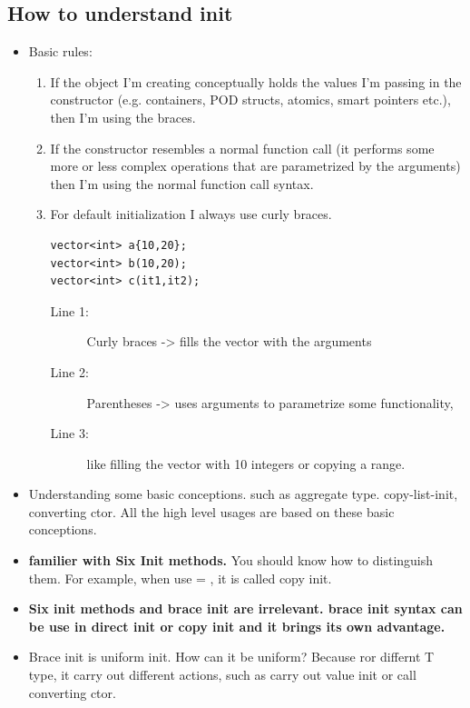 \documentclass[a4paper,11pt,twoside]{book}
\begin{document}
\subsection{How to understand init}
\begin{itemize}
	\item Basic rules:
	\begin{enumerate}
		\item If the object I'm creating conceptually holds the values I'm passing in the constructor (e.g. containers, POD structs, atomics, smart pointers etc.), then I'm using the braces.
		
		\item If the constructor resembles a normal function call (it performs some more or less complex operations that are parametrized by the arguments) then I'm using the normal function call syntax.
		
		\item For default initialization I always use curly braces.
\begin{lstlisting}
vector<int> a{10,20};
vector<int> b(10,20);
vector<int> c(it1,it2); 
\end{lstlisting}
\begin{description}
	\item[Line 1:] Curly braces -> fills the vector with the arguments
	\item[Line 2:] Parentheses -> uses arguments to parametrize some functionality, 
	\item[Line 3:] like filling the vector with 10 integers or copying a range.
\end{description}
	\end{enumerate}
	
	\item Understanding some basic conceptions. such as aggregate type. copy-list-init, converting ctor. All the high level usages are based on these basic conceptions. 
	
	\item \textbf{familier with Six Init methods.} You should know how to distinguish them. For example, when use = , it is called copy init. 
	
	\item \textbf{Six init methods and brace init are irrelevant. brace init syntax can be use in direct init or copy init and it brings its own advantage.} 
	
	\item Brace init is uniform init. How can it be uniform? Because ror differnt T type, it carry out different actions, such as carry out value init or call converting ctor.
	

\end{itemize}
\end{document}
